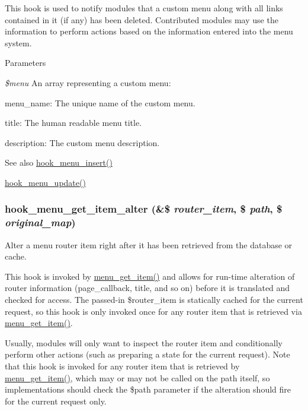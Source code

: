 This hook is used to notify modules that a custom menu along with all links contained in it (if any) has been deleted. Contributed modules may use the information to perform actions based on the information entered into the menu system.


\begin{DoxyParams}{Parameters}
\item[{\em \$menu}]An array representing a custom menu:
\begin{DoxyItemize}
\item menu\_\-name: The unique name of the custom menu.
\item title: The human readable menu title.
\item description: The custom menu description.
\end{DoxyItemize}\end{DoxyParams}
\begin{DoxySeeAlso}{See also}
\hyperlink{group__hooks_ga8459a7c61564db3b5ccd53d39ada1555}{hook\_\-menu\_\-insert()} 

\hyperlink{group__hooks_ga21331911abfc25de5921af04a76a0921}{hook\_\-menu\_\-update()} 
\end{DoxySeeAlso}
\hypertarget{group__hooks_ga452b92c6bb89d61eefe0a86430c62d73}{
\subsubsection[{hook\_\-menu\_\-get\_\-item\_\-alter}]{\setlength{\rightskip}{0pt plus 5cm}hook\_\-menu\_\-get\_\-item\_\-alter (\&\$ {\em router\_\-item}, \/  \$ {\em path}, \/  \$ {\em original\_\-map})}}
\label{group__hooks_ga452b92c6bb89d61eefe0a86430c62d73}
Alter a menu router item right after it has been retrieved from the database or cache.

This hook is invoked by \hyperlink{group__menu_ga855b1ca6ef9e44eb6107a2b9d0f581df}{menu\_\-get\_\-item()} and allows for run-\/time alteration of router information (page\_\-callback, title, and so on) before it is translated and checked for access. The passed-\/in \$router\_\-item is statically cached for the current request, so this hook is only invoked once for any router item that is retrieved via \hyperlink{group__menu_ga855b1ca6ef9e44eb6107a2b9d0f581df}{menu\_\-get\_\-item()}.

Usually, modules will only want to inspect the router item and conditionally perform other actions (such as preparing a state for the current request). Note that this hook is invoked for any router item that is retrieved by \hyperlink{group__menu_ga855b1ca6ef9e44eb6107a2b9d0f581df}{menu\_\-get\_\-item()}, which may or may not be called on the path itself, so implementations should check the \$path parameter if the alteration should fire for the current request only.


